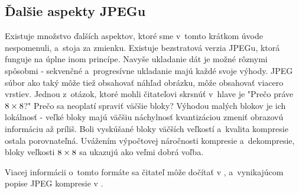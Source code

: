 \subsection{Ďalšie aspekty JPEGu}

Existuje množstvo ďalších aspektov, ktoré sme v~tomto krátkom úvode
nespomenuli, a~stoja za zmienku. Existuje bezstratová verzia JPEGu,
ktorá funguje na úplne inom princípe. Navyše ukladanie dát je možné
rôznymi spôsobmi - sekvenčné a~progresívne ukladanie majú každé svoje
výhody. JPEG súbor ako taký môže tiež obsahovať náhľad obrázku, 
môže obsahovať viacero vrstiev.
Jednou z~otázok, ktoré mohli čitateľovi skrsnúť v~hlave je "Prečo
práve $8\times8$?" Prečo sa neoplatí spraviť väčšie bloky? Výhodou malých
blokov je ich lokálnosť - veľké bloky majú väčšiu náchylnosť
kvantizáciou zmeniť obrazovú informáciu až príliš. Boli vyskúšané
bloky väčších veľkostí a~kvalita kompresie ostala porovnateľná.
Uvážením výpočtovej náročnosti kompresie a~dekompresie, bloky
veľkosti $8\times8$ sa ukazujú ako veľmi dobrá voľba.

Viacej informácii o~tomto formáte sa čitateľ môže dočítať v
\cite{wiki:jfif}, \cite{wiki:jpeg} a~vynikajúcom popise JPEG kompresie
v \cite{wallace1991}.
